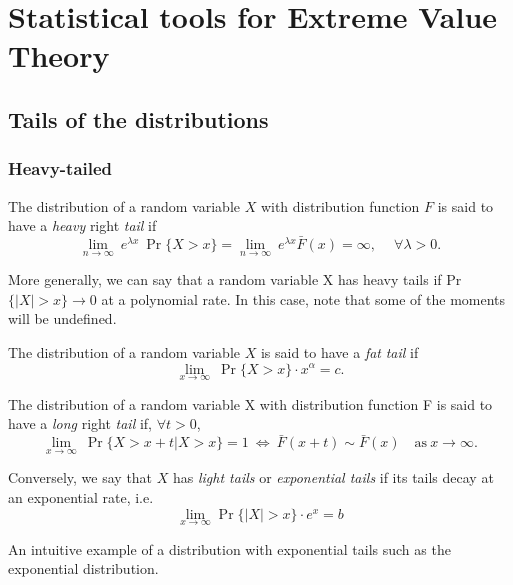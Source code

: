 \thispagestyle{empty}

\chapter{Statistical tools for Extreme Value Theory}\label{appA}

\section{Tails of the distributions}\label{app:tails}


\subsection*{Heavy-tailed} 

\begin{definition}
The distribution of a random variable $X$ with distribution function $F$ is said 
to have a \emph{heavy} right \emph{tail} if 
\begin{equation}
\displaystyle{\lim_{n \to \infty}} \ e^{\lambda x} \ \Pr\{X>x\}=\displaystyle{\lim_{n 
\to \infty}} \ e^{\lambda x} \bar{F}(x)=\infty , \ \quad \forall \lambda>0.
\end{equation}
\end{definition}
More generally, we can say that a random variable X has heavy tails if Pr$\{|X|>x\}\to 0$ at 
a polynomial rate. In this case, note that some of the moments will be undefined.

\begin{definition}
The distribution of a random variable $X$ is said to have a \emph{fat} \emph{tail} if
\begin{equation}
\displaystyle{\lim_{x \to \infty}} \ \Pr\{ X > x \}\cdot x^{\alpha} = c.
\end{equation}
\end{definition}


\begin{definition}
The distribution of a random variable X with distribution function F is said to have a \emph{long} 
right \emph{tail} if,  $\forall t > 0$,
\begin{equation}
\displaystyle{\lim_{x \to \infty}} \ \Pr\{X>x+t|X>x\}=1 \ \Leftrightarrow \ 
\bar{F}(x+t)\sim\bar{F}(x) \quad \text{as} \ x\to\infty.
\end{equation}
\end{definition}


\begin{definition}
Conversely, we say that $X$ has \emph{light tails} or \emph{exponential tails} if its tails decay at an exponential rate, i.e. 
\begin{equation}
\displaystyle{\lim_{x \to \infty}} \Pr\{|X|>x\} \cdot  e^x=b
\end{equation}
\end{definition}
An intuitive example of a distribution with exponential tails such as the exponential distribution.


